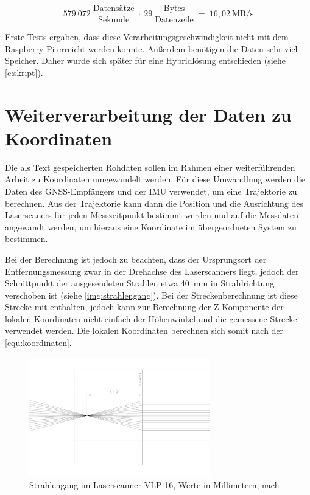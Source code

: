 \documentclass[a4paper,12pt,bibliography=totoc, listof=totoc,titlepage,pointlessnumbers]{scrreprt}
\begin{document}
\begin{equation}
579~072~\frac{\text{Datens\"{a}tze}}{\text{Sekunde}}~\cdot~29~\frac{\text{Bytes}}{\text{Datenzeile}}~=~16,02~\text{MB/s}
\label{equ:Datenrate}
\end{equation}

Erste Tests ergaben, dass diese Verarbeitungsgeschwindigkeit nicht mit dem Rasp\-berry Pi erreicht werden konnte. Außerdem benötigen die Daten sehr viel Speicher. Daher wurde sich später für eine Hybridlösung entschieden (siehe \autoref{c:skript}).

\section{Weiterverarbeitung der Daten zu Koordinaten}
Die als Text gespeicherten Rohdaten sollen im Rahmen einer weiterführenden Arbeit zu Koordinaten umgewandelt werden. Für diese Umwandlung werden die Daten des GNSS-Empfängers und der IMU verwendet, um eine Trajektorie zu berechnen. Aus der Trajektorie kann dann die Position und die Ausrichtung des Laser\-scan\-ers für jeden Messzeitpunkt bestimmt werden und auf die Messdaten angewandt werden, um hieraus eine Koordinate im übergeordneten System zu bestimmen.

Bei der Berechnung ist jedoch zu beachten, dass der Ursprungsort der Entfernungsmessung zwar in der Drehachse des Laser\-scan\-ners liegt, jedoch der Schnittpunkt der ausgesendeten Strahlen etwa 40~mm in Strahlrichtung verschoben ist (siehe \autoref{img:strahlengang}). Bei der Streckenberechnung ist diese Strecke mit enthalten, jedoch kann zur Berechnung der Z-Komponente der lokalen Koordinaten nicht einfach der Höhenwinkel und die gemessene Strecke verwendet werden. Die lokalen Koordinaten berechnen sich somit nach der \autoref{equ:koordinaten}.

\begin{figure}
 \centering
 \includegraphics[width=0.7\textwidth]{./img/Strahlengang.png}
 \caption{Strahlengang im Laser\-scan\-ner VLP-16, Werte in Millimetern, nach 
\citet{vlpCAD}}
 \label{img:strahlengang}
\end{figure}
\end{document}
